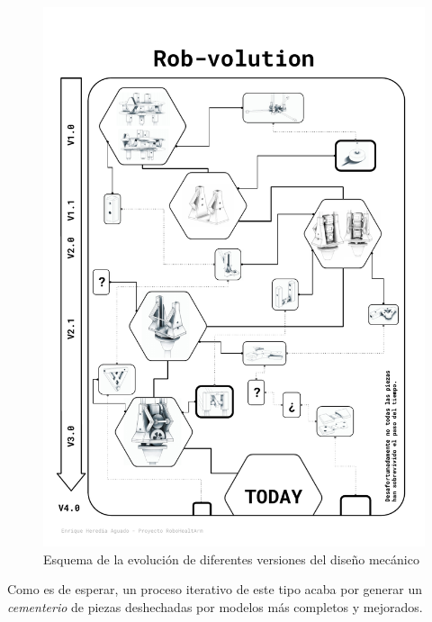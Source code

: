 \begin{figure}[H]
    \vspace{-1cm}
    \begin{adjustwidth}{-1.9cm}{-1.5cm}
       \centering
       \includegraphics[width=1.1\textwidth]{figuras/Imagenes_PuntoPartida/Rob-volution.pdf}
       \caption{Esquema de la evolución de diferentes versiones del diseño mecánico}
       \label{fig:PuntoPartida:rovbolution}
   \end{adjustwidth}
\end{figure}

Como es de esperar, un proceso iterativo de este tipo acaba por generar un \textit{cementerio} de piezas deshechadas por modelos más completos y mejorados.


%
